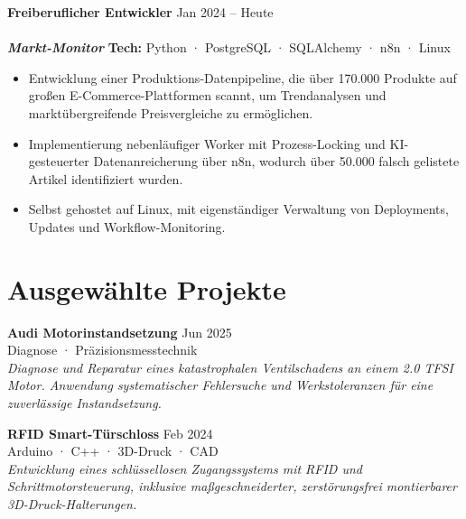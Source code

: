 \documentclass[10pt, a4paper]{article}
\newcommand{\entry}[3]{%
  \textbf{\large #1} \hfill \textcolor{subtle}{\small #2}%
  \def\temp{#3}\ifx\temp\empty\else\\[0.1em]\textbf{#3}\fi
}
\newcommand{\project}[2]{%
  \textbf{\textit{#1}} \hfill \textcolor{subtle}{\footnotesize \textbf{Tech:} #2}\vspace{0.1em}
}
\begin{document}
\begin{minipage}[t]{0.64\linewidth}
\entry{Freiberuflicher Entwickler}{Jan 2024 – Heute}{}\\[0.2em]
\project{Markt-Monitor}{Python · PostgreSQL · SQLAlchemy · n8n · Linux}
\begin{itemize}
  \item Entwicklung einer Produktions-Datenpipeline, die über 170.000 Produkte auf großen E-Commerce-Plattformen scannt, um Trendanalysen und marktübergreifende Preisvergleiche zu ermöglichen.
  \item Implementierung nebenläufiger Worker mit Prozess-Locking und KI-gesteuerter Datenanreicherung über n8n, wodurch über 50.000 falsch gelistete Artikel identifiziert wurden.
  \item Selbst gehostet auf Linux, mit eigenständiger Verwaltung von Deployments, Updates und Workflow-Monitoring.
\end{itemize}

\vspace{0.4em}

\section{Ausgewählte Projekte}

\textbf{Audi Motorinstandsetzung} \hfill \textcolor{subtle}{\small Jun 2025}\\[0.15em]
\textcolor{subtle}{\footnotesize Diagnose · Präzisionsmesstechnik}\\
\textit{\footnotesize Diagnose und Reparatur eines katastrophalen Ventilschadens an einem 2.0 TFSI Motor. Anwendung systematischer Fehlersuche und Werkstoleranzen für eine zuverlässige Instandsetzung.}

\vspace{0.5em}

\textbf{RFID Smart-Türschloss} \hfill \textcolor{subtle}{\small Feb 2024}\\[0.15em]
\textcolor{subtle}{\footnotesize Arduino · C++ · 3D-Druck · CAD}\\
\textit{\footnotesize Entwicklung eines schlüssellosen Zugangssystems mit RFID und Schrittmotorsteuerung, inklusive maßgeschneiderter, zerstörungsfrei montierbarer 3D-Druck-Halterungen.}

\end{minipage}
\hfill
\end{document}
